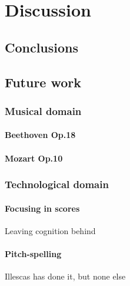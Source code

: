 \chapter{Discussion}

\section{Conclusions}

\section{Future work}
  \subsection{Musical domain}
    \subsubsection{Beethoven Op.18}
    \subsubsection{Mozart Op.10}
  \subsection{Technological domain}
    \subsubsection{Focusing in scores}
    Leaving cognition behind
    \subsubsection{Pitch-spelling}
    Illescas has done it, but none else

\newpage
